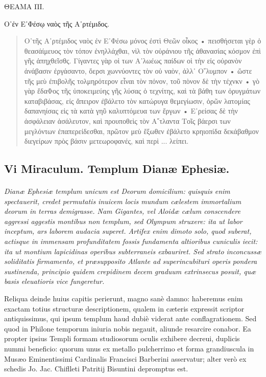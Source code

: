 \documentclass[a4paper, 11pt, oneside, polutonikogreek, latin]{article}
\begin{document}
\clearpage
\begin{center}
ΘΕΑΜΑ ΠI.
\end{center}
\begin{center}
Ο῾ἐν E᾽Φέσῳ ναὸς τῆς Α᾽ρτέμιδος.
\end{center}
\begin{quote}
Ο῾τῆς Α᾽ρτέμιδος ναὸς ἐν E᾽Φέσω μόνος ἐστὶ Θεῶν οἶκος • πεισθήσεται γὲρ ὁ θεασάίμευος τὸν τόπον ἐνηλλάχθαι, νὶλ τὸν οὐράνιου τῆς ἀθανασίας κόσμον ἐπὶ γῆς ἀπηχθεῖσθς. Γίγαντες γὰρ οἱ των Α᾽λωέως παίδων οἱ τὴν εἰς οὐρανὸν ἀνάβασιν ἐργάσαντο, ὄερσι χωννύοντες τὸν οὐ ναὸν, ἀλλ᾽ Ο῎λυμπον • ὥστε τῆς μεὺ ἐπιβολῆς τολμηρότερον εἶναι τὸν πόνον, τοῦ πὸνον δὲ τὴν τέχνκν • γὸ γὰρ ἔδαΦος τῆς ὑποκειμεύης γῆς λύσας ὁ τεχνίτης, καὶ τὰ βάθη των ὀρυγμάτων καταβιβάσας, εἰς ἄπειρον ἐβάλετο τὸν κατώρυγα θεμεγίωσιν, ὀρῶν λατομίας δαπανηίσας εἰς τὰ κατὰ γηῦ καλυπτόμευα των ἔργων • E᾽ρείσας δὲ τὴν ἀσφάλειαν ἀσάλευτον, καὶ προυποθεὶς τὸν Α῎τλαντα Τοῖς βάερσι των μεγλόντων ἐπαπερείδεσθαι, πρῶτον μεὺ ἔξωθεν ἐβάλετο κρηιοπίδα δεκάβαθμον διεγείρων πρὸς βάσιν μετεωροφανές, καὶ περὶ ... λείπει.
\end{quote}
\clearpage
\subsection{Vi Miraculum. Templum Dianæ Ephesiæ.}
\paragraph{}
\emph{Dianæ Ephesiæ templum unicum est Deorum domicilium: quisquis enim spectauerit, credet permutatis inuicem locis mundum cælestem immortalium deorum in terras demigrasse. Nam Gigantes, vel Aloidæ cælum conscendere aggressi aggestis montibus non templum, sed Olympum struxere: ita ut labor inceptum, ars laborem audacia superet. Artifex enim dimoto solo, quod suberat, actisque in immensam profunditatem fossis fundamenta altioribus cuniculis iecit: ita ut montium lapicidinas operibus subterraneis exbauriret. Sed strato inconcussæ soliditatis firmamento, et præsupposito Atlante ad superincubituri operis pondera sustinenda, principio quidem crepidinem decem graduum extrinsecus posuit, quæ basis eleuatioris vice fungeretur.}

Reliqua deinde huius capitis perierunt, magno sanè damno: haberemus enim exactam totius structuræ descriptionem, qualem in cæteris expressit scriptor antiquissimus, qui ipsum templum haud dubiè viderat ante conflagrationem. Sed quod in Philone temporum iniuria nobis negauit, aliunde resarcire conabor. Ea propter ipsius Templi formam studiosorum oculis exhibere decreui, duplicis nummi beneficio: quorum unus ex metallo pulcherrimo et forma grandiuscula in Musæo Eminentissimi Cardinalis Francisci Barberini asservatur; alter verò ex schedis Jo. Jac. Chiflleti Patritij Bisuntini depromptus est.
\end{document}
